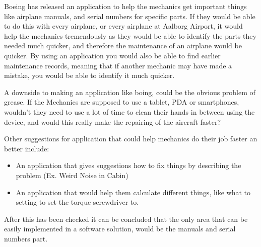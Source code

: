 Boeing has released an application to help the mechanics get important things like airplane manuals, and serial numbers for specific parts. If they would be able to do this with every airplane, or every airplane at Aalborg Airport, it would help the mechanics tremendously as they would be able to identify the parts they needed much quicker, and therefore the maintenance of an airplane would be quicker. By using an application you would also be able to find earlier maintenance records, meaning that if another mechanic may have made a mistake, you would be able to identify it much quicker\cite{cnet_boeing_app}.

A downside to making an application like boing, could be the obvious problem of grease. If the Mechanics are supposed to use a tablet, PDA or smartphones, wouldn't they need to use a lot of time to clean their hands in between using the device, and would this really make the repairing of the aircraft faster?

Other suggestions for application that could help mechanics do their job faster an better include:
\begin{itemize}
\item An application that gives suggestions how to fix things by describing the problem (Ex. Weird Noise in Cabin)
\item An application that would help them calculate different things, like what to setting to set the torque screwdriver to. 
\end{itemize}

After this has been checked it can be concluded that the only area that can be easily implemented in a software solution, would be the manuals and serial numbers part.
